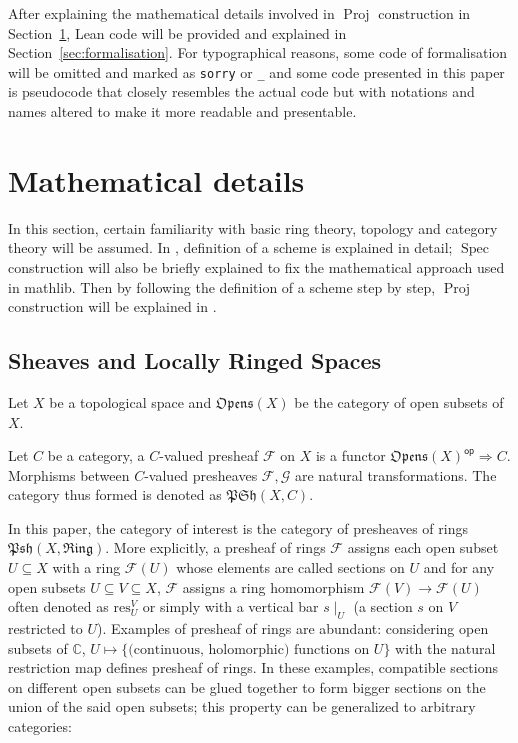 \documentclass[a4paper,UKenglish,cleveref, autoref, thm-restate]{lipics-v2021}
\begin{document}
After explaining the mathematical details involved in $\operatorname{Proj}$ construction in Section~\ref{sec:maths}, Lean code will be provided and explained in Section~\ref{sec:formalisation}. For typographical reasons, some code of formalisation will be omitted and marked as \lstinline{sorry} or \lstinline{_} and some code presented in this paper is pseudocode that closely resembles the actual code but with notations and names altered to make it more readable and presentable.

\section{Mathematical details}\label{sec:maths}
In this section, certain familiarity with basic ring theory, topology and category theory will be assumed. In , definition of a scheme is explained in detail; $\operatorname{Spec}$ construction will also be briefly explained to fix the mathematical approach used in \textsf{mathlib}. Then by following the definition of a scheme step by step, $\operatorname{Proj}$ construction will be explained in .

\subsection{Sheaves and Locally Ringed Spaces}\label{sec:pre-def}
Let $X$ be a topological space and $\mathfrak{Opens}(X)$ be the category of open subsets of $X$.

\begin{definition} 
    Let $C$ be a category, a $C$-valued presheaf $\mathcal{F}$ on $X$ is a functor $\mathfrak{Opens}(X)^{\mathsf{op}} \Longrightarrow C$. Morphisms between $C$-valued presheaves $\mathcal{F, G}$ are natural transformations. The category thus formed is denoted as $\mathfrak{PSh}(X, C)$.
    \label{def:presheaf}
\end{definition}
In this paper, the category of interest is the category of presheaves of rings $\mathfrak{Psh}(X, \mathfrak{Ring})$. More explicitly, a presheaf of rings $\mathcal{F}$ assigns each open subset $U \subseteq X$ with a ring $\mathcal{F}(U)$ whose elements are called sections on $U$ and for any open subsets $U \subseteq V\subseteq X$, $\mathcal F$ assigns a ring homomorphism $\mathcal{F}(V)\to\mathcal{F}(U)$ often denoted as $\mathrm{res}^V_U$ or simply with a vertical bar $s\!\mid_U$ (a section $s$ on $V$ restricted to $U$). Examples of presheaf of rings are abundant: considering open subsets of $\mathbb{C}$, $U \mapsto \{\text{(continuous, holomorphic) functions on~} U\}$ with the natural restriction map defines presheaf of rings. In these examples, compatible sections on different open subsets can be glued together to form bigger sections on the union of the said open subsets; this property can be generalized to arbitrary categories:
\end{document}
